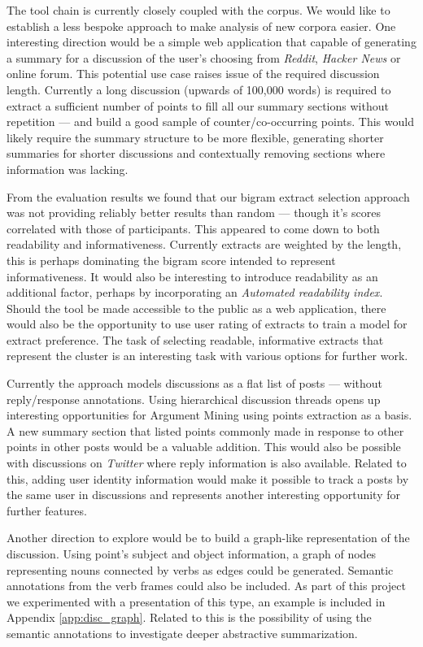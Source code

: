     The tool chain is currently closely coupled with the corpus. We would like to establish a less bespoke approach to make analysis of new corpora easier. One interesting direction would be a simple web application that capable of generating a summary for a discussion of the user's choosing from \textit{Reddit}, \textit{Hacker News} or online forum. This potential use case raises issue of the required discussion length. Currently a long discussion (upwards of 100,000 words) is required to extract a sufficient number of points to fill all our summary sections without repetition --- and build a good sample of counter/co-occurring points. This would likely require the summary structure to be more flexible, generating shorter summaries for shorter discussions and contextually removing sections where information was lacking.

    From the evaluation results we found that our bigram extract selection approach was not providing reliably better results than random --- though it's scores correlated with those of participants. This appeared to come down to both readability and informativeness. Currently extracts are weighted by the length, this is perhaps dominating the bigram score intended to represent informativeness. It would also be interesting to introduce readability as an additional factor, perhaps by incorporating an \textit{Automated readability index}. Should the tool be made accessible to the public as a web application, there would also be the opportunity to use user rating of extracts to train a model for extract preference. The task of selecting readable, informative extracts that represent the cluster is an interesting task with various options for further work.

    Currently the approach models discussions as a flat list of posts --- without reply/response annotations. Using hierarchical discussion threads opens up interesting opportunities for Argument Mining using points extraction as a basis. A new summary section that listed points commonly made in response to other points in other posts would be a valuable addition. This would also be possible with discussions on \textit{Twitter} where reply information is also available. Related to this, adding user identity information would make it possible to track a posts by the same user in discussions and represents another interesting opportunity for further features.

    Another direction to explore would be to build a graph-like representation of the discussion. Using point's subject and object information, a graph of nodes representing nouns connected by verbs as edges could be generated. Semantic annotations from the verb frames could also be included. As part of this project we experimented with a presentation of this type, an example is included in Appendix \ref{app:disc_graph}. Related to this is the possibility of using the semantic annotations to investigate deeper abstractive summarization.

